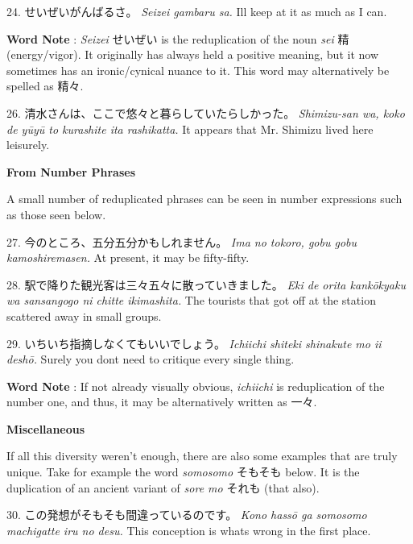 \par{24. せいぜいがんばるさ。 \hfill\break
 \emph{Seizei gambaru sa. }\hfill\break
I\textquotesingle ll keep at it as much as I can. }

\par{\textbf{Word Note }: \emph{Seizei }せいぜい is the reduplication of the noun \emph{sei }精 (energy\slash vigor). It originally has always held a positive meaning, but it now sometimes has an ironic\slash cynical nuance to it. This word may alternatively be spelled as 精々. }

\par{26. 清水さんは、ここで悠々と暮らしていたらしかった。 \hfill\break
 \emph{Shimizu-san wa, koko de yūyū to kurashite ita rashikatta. }\hfill\break
It appears that Mr. Shimizu lived here leisurely. }

\begin{center}
\textbf{From Number Phrases }
\end{center}

\par{ A small number of reduplicated phrases can be seen in number expressions such as those seen below. }

\par{27. 今のところ、五分五分かもしれません。 \hfill\break
 \emph{Ima no tokoro, gobu gobu kamoshiremasen. }\hfill\break
At present, it may be fifty-fifty. }

\par{28. 駅で降りた観光客は三々五々に散っていきました。 \hfill\break
 \emph{Eki de orita kankōkyaku wa sansangogo ni chitte ikimashita. }\hfill\break
The tourists that got off at the station scattered away in small groups. }

\par{29. いちいち指摘しなくてもいいでしょう。 \hfill\break
 \emph{Ichi\textquotesingle ichi shiteki shinakute mo ii deshō. }\hfill\break
Surely you don\textquotesingle t need to critique every single thing. }

\par{\textbf{Word Note }: If not already visually obvious, \emph{ichi\textquotesingle ichi }is reduplication of the number one, and thus, it may be alternatively written as 一々. }

\begin{center}
\textbf{Miscellaneous } 
\end{center}

\par{ If all this diversity weren't enough, there are also some examples that are truly unique. Take for example the word \emph{somosomo }そもそも below. It is the duplication of an ancient variant of \emph{sore mo }それも (that also). }

\par{30. この発想がそもそも間違っているのです。 \hfill\break
 \emph{Kono hassō ga somosomo machigatte iru no desu. }\hfill\break
This conception is what\textquotesingle s wrong in the first place. }
    